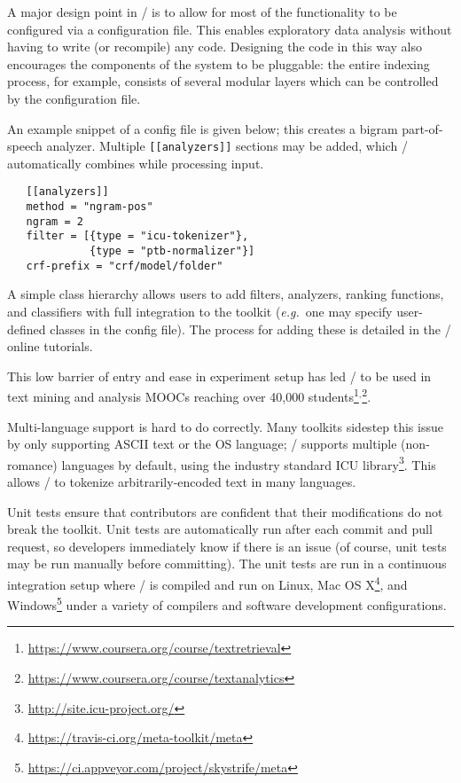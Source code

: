 A major design point in \meta/ is to allow for most of the functionality to be
configured via a configuration file. This enables exploratory data analysis
without having to write (or recompile) any code. Designing the code in this way
also encourages the components of the system to be pluggable: the entire
indexing process, for example, consists of several modular layers which can be
controlled by the configuration file.

An example snippet of a config file is given below; this creates a bigram
part-of-speech analyzer. Multiple \texttt{[[analyzers]]} sections may be added,
which \meta/ automatically combines while processing input.

{\small
\begin{verbatim}
   [[analyzers]]
   method = "ngram-pos"
   ngram = 2
   filter = [{type = "icu-tokenizer"},
             {type = "ptb-normalizer"}]
   crf-prefix = "crf/model/folder"
\end{verbatim}}

A simple class hierarchy allows users to add filters, analyzers, ranking
functions, and classifiers with full integration to the toolkit
(\emph{e.g.}\ one
may specify user-defined classes in the config file). The process for adding
these is detailed in the \meta/ online tutorials.

This low barrier of entry and ease in experiment setup has led \meta/ to be used
in text mining and analysis MOOCs reaching over 40,000
students\footnote{\url{https://www.coursera.org/course/textretrieval}}$^,$\footnote{\url{https://www.coursera.org/course/textanalytics}}.

Multi-language support is hard to do correctly. Many toolkits sidestep this
issue by only supporting ASCII text or the OS language; \meta/ supports multiple
(non-romance) languages by default, using the industry standard ICU
library\footnote{\url{http://site.icu-project.org/}}. This allows \meta/ to
tokenize arbitrarily-encoded text in many languages.

Unit tests ensure that contributors are confident that their modifications do
not break the toolkit. Unit tests are automatically run after each commit and
pull request, so developers immediately know if there is an issue (of course,
unit tests may be run manually before committing). The unit tests are run in a
continuous integration setup where \meta/ is compiled and run on Linux, Mac OS
X\footnote{\url{https://travis-ci.org/meta-toolkit/meta}}, and
Windows\footnote{\url{https://ci.appveyor.com/project/skystrife/meta}} under a
variety of compilers and software development configurations.
